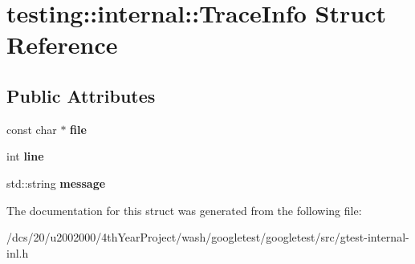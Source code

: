 \hypertarget{structtesting_1_1internal_1_1TraceInfo}{}\section{testing\+:\+:internal\+:\+:Trace\+Info Struct Reference}
\label{structtesting_1_1internal_1_1TraceInfo}
\subsection*{Public Attributes}
\begin{DoxyCompactItemize}
\item 
\mbox{\label{structtesting_1_1internal_1_1TraceInfo_a5d801209d3c0840aa55cfd4b67504254}} 
const char $\ast$ {\bfseries file}
\item 
\mbox{\label{structtesting_1_1internal_1_1TraceInfo_ae9d269de1b77f4a3180d0d34acb4d7ff}} 
int {\bfseries line}
\item 
\mbox{\label{structtesting_1_1internal_1_1TraceInfo_a39e74f39ce6d5fdbac799abdb1c27f90}} 
std\+::string {\bfseries message}
\end{DoxyCompactItemize}


The documentation for this struct was generated from the following file\+:\begin{DoxyCompactItemize}
\item 
/dcs/20/u2002000/4th\+Year\+Project/wash/googletest/googletest/src/gtest-\/internal-\/inl.\+h\end{DoxyCompactItemize}
